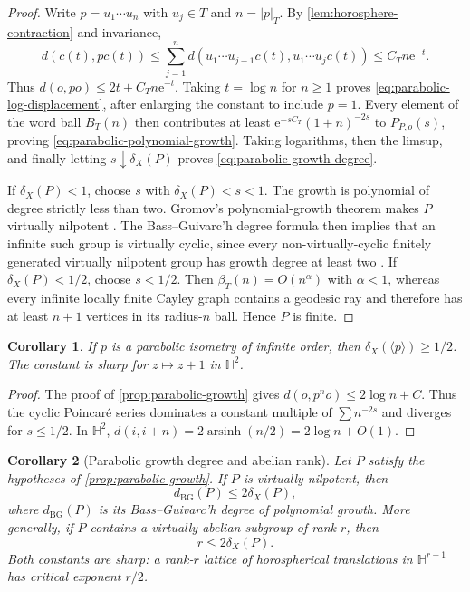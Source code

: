 \documentclass[11pt]{article}
\newtheorem{corollary}[corollary]{Corollary}
\theoremstyle{definition}
\newcommand{\e}{\mathrm e}
\begin{document}
\begin{proof}
Write $p=u_1\cdots u_n$ with $u_j\in T$ and $n=|p|_T$.  By
\cref{lem:horosphere-contraction} and invariance,
\[
 d(c(t),pc(t))
 \le\sum_{j=1}^n d(u_1\cdots u_{j-1}c(t),u_1\cdots u_jc(t))
 \le C_Tn\e^{-t}.
\]
Thus $d(o,po)\le2t+C_Tn\e^{-t}$.  Taking $t=\log n$ for $n\ge1$ proves
\eqref{eq:parabolic-log-displacement}, after enlarging the constant to include $p=1$.
Every element of the word ball $B_T(n)$ then contributes at least
$\e^{-sC_T}(1+n)^{-2s}$ to $P_{P,o}(s)$, proving
\eqref{eq:parabolic-polynomial-growth}.  Taking logarithms, then the limsup, and finally
letting $s\downarrow\delta_X(P)$ proves \eqref{eq:parabolic-growth-degree}.

If $\delta_X(P)<1$, choose $s$ with $\delta_X(P)<s<1$.  The growth is polynomial of degree
strictly less than two.  Gromov's polynomial-growth theorem makes $P$ virtually nilpotent
\cite{Gromov1981}. The Bass--Guivarc'h degree formula then implies that an infinite such group
is virtually cyclic, since every non-virtually-cyclic finitely generated virtually nilpotent
group has growth degree at least two \cite{Bass1972,Guivarch1973}.  If
$\delta_X(P)<1/2$, choose $s<1/2$.  Then $\beta_T(n)=O(n^\alpha)$ with $\alpha<1$, whereas
every infinite locally finite Cayley graph contains a geodesic ray and therefore has at least
$n+1$ vertices in its radius-$n$ ball.  Hence $P$ is finite.
\end{proof}

\begin{corollary}
\label{prop:parabolic-half}
If $p$ is a parabolic isometry of infinite order, then
$\delta_X(\langle p\rangle)\ge1/2$.  The constant is sharp for $z\mapsto z+1$ in
$\mathbb H^2$.
\end{corollary}

\begin{proof}
The proof of \cref{prop:parabolic-growth} gives
$d(o,p^n o)\le2\log n+C$.  Thus the cyclic Poincar\'e series dominates a constant multiple of
$\sum n^{-2s}$ and diverges for $s\le1/2$.  In $\mathbb H^2$,
$d(i,i+n)=2\operatorname{arsinh}(n/2)=2\log n+O(1)$.
\end{proof}

\begin{corollary}[Parabolic growth degree and abelian rank]
\label{cor:parabolic-rank}
Let $P$ satisfy the hypotheses of \cref{prop:parabolic-growth}.
If $P$ is virtually nilpotent, then
\begin{equation}\label{eq:parabolic-bg-bound}
 d_{\mathrm{BG}}(P)\le2\delta_X(P),
\end{equation}
where $d_{\mathrm{BG}}(P)$ is its Bass--Guivarc'h degree of polynomial growth.  More generally,
if $P$ contains a virtually abelian subgroup of rank $r$, then
\begin{equation}\label{eq:parabolic-rank-bound}
 r\le2\delta_X(P).
\end{equation}
Both constants are sharp: a rank-$r$ lattice of horospherical translations in
$\mathbb H^{r+1}$ has critical exponent $r/2$.
\end{corollary}
\end{document}
